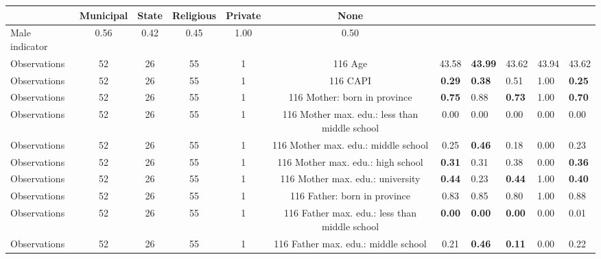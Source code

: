 \begin{tabular}{l c c c c c c }
\toprule
& \textbf{Municipal} & \textbf{State} & \textbf{Religious} & \textbf{Private} & \textbf{None} \\
\midrule
Male indicator &      0.56 &      0.42 &      0.45 &      1.00 &      0.50 \\
\midrule
Observations &        52 &        26 &        55 &         1 &       116
Age &     43.58 & \textbf{    43.99} &     43.62 &     43.94 &     43.62 \\
\midrule
Observations &        52 &        26 &        55 &         1 &       116
CAPI & \textbf{     0.29} & \textbf{     0.38} &      0.51 &      1.00 & \textbf{     0.25} \\
\midrule
Observations &        52 &        26 &        55 &         1 &       116
Mother: born in province & \textbf{     0.75} &      0.88 & \textbf{     0.73} &      1.00 & \textbf{     0.70} \\
\midrule
Observations &        52 &        26 &        55 &         1 &       116
Mother max. edu.: less than middle school &      0.00 &      0.00 &      0.00 &      0.00 &      0.00 \\
\midrule
Observations &        52 &        26 &        55 &         1 &       116
Mother max. edu.: middle school &      0.25 & \textbf{     0.46} &      0.18 &      0.00 &      0.23 \\
\midrule
Observations &        52 &        26 &        55 &         1 &       116
Mother max. edu.: high school & \textbf{     0.31} &      0.31 &      0.38 &      0.00 & \textbf{     0.36} \\
\midrule
Observations &        52 &        26 &        55 &         1 &       116
Mother max. edu.: university & \textbf{     0.44} &      0.23 & \textbf{     0.44} &      1.00 & \textbf{     0.40} \\
\midrule
Observations &        52 &        26 &        55 &         1 &       116
Father: born in province &      0.83 &      0.85 &      0.80 &      1.00 &      0.88 \\
\midrule
Observations &        52 &        26 &        55 &         1 &       116
Father max. edu.: less than middle school & \textbf{     0.00} & \textbf{     0.00} & \textbf{     0.00} &      0.00 &      0.01 \\
\midrule
Observations &        52 &        26 &        55 &         1 &       116
Father max. edu.: middle school &      0.21 & \textbf{     0.46} & \textbf{     0.11} &      0.00 &      0.22 \\

\end{tabular}
